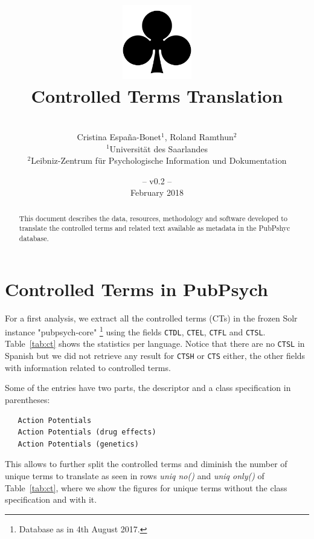\documentclass[a4paper,11pt]{article}
\title{
\includegraphics[width=3cm]{./img/200px-SuitClubs.png} \\
\Huge Controlled Terms Translation \\ 
}
\author{\vspace*{1cm}\\ \LARGE Cristina Espa\~na-Bonet$^{1}$, Roland Ramthun$^{2}$ \medskip \\ 
                        \Large $^{1}$Universit\"at des Saarlandes\\ \Large $^{2}$Leibniz-Zentrum für Psychologische Information und Dokumentation}
\date{\vspace*{2cm} -- v0.2 --\\February 2018}
\begin{document}
\clearpage\maketitle
\thispagestyle{empty}

\vspace*{5cm}
\begin{abstract}
This document describes the data, resources, methodology and software developed to translate the controlled terms and related text available as metadata in the PubPshyc database.
\end{abstract}

\newpage
\tableofcontents
\clearpage



\section{Controlled Terms in PubPsych}
\label{s:ct}

For a first analysis, we extract all the controlled terms (CTs) in the frozen Solr instance "pubpsych-core"%
\footnote{Database as in 4th August 2017.}  using the fields {\tt CTDL}, {\tt CTEL}, {\tt CTFL} and {\tt CTSL}. Table~\ref{tab:ct} shows the statistics per language. Notice that there are no {\tt CTSL} in Spanish but we did not retrieve any result for {\tt CTSH} or {\tt CTS} either, the other fields with information related to controlled terms.

Some of the entries have two parts, the descriptor and a class specification in parentheses:
{\small 
\begin{verbatim}
   Action Potentials
   Action Potentials (drug effects)
   Action Potentials (genetics)
\end{verbatim}
}

This allows to further split the controlled terms and diminish the number of unique terms to translate as seen in rows \emph{uniq no()} and \emph{uniq only()} of Table~\ref{tab:ct}, where we show the figures for unique terms without the class specification and with it.
\end{document}
